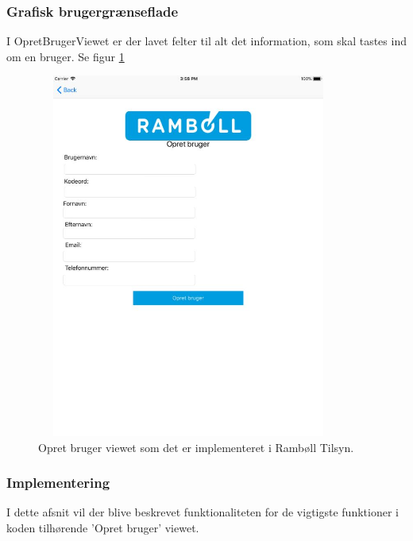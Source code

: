 \subsubsection{Grafisk brugergrænseflade}
I OpretBrugerViewet er der lavet felter til alt det information, som skal tastes ind om en bruger. Se figur \ref{fig:OpretBrugerView}
\begin{figure}[H] %
	\centering
	\includegraphics[height=12cm, width=10cm]{../ArkitekturDesign/Design/OpretBruger/OpretBrugerView}
	\caption{Opret bruger viewet som det er implementeret i Rambøll Tilsyn.}
	\label{fig:OpretBrugerView}
\end{figure}

\clearpage

\subsubsection{Implementering}
I dette afsnit vil der blive beskrevet funktionaliteten for de vigtigste funktioner i koden tilhørende 'Opret bruger' viewet.

